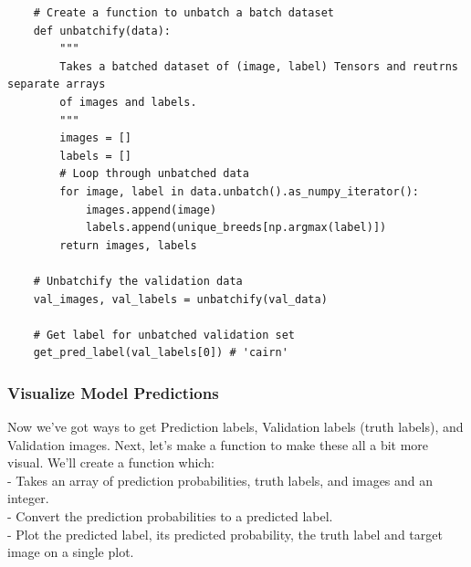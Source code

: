 \documentclass[11pt, a4paper]{article}
\begin{document}
\begin{spacing}{1.1}
\begin{lstlisting}
	# Create a function to unbatch a batch dataset
	def unbatchify(data):
		"""
		Takes a batched dataset of (image, label) Tensors and reutrns separate arrays
		of images and labels.
		"""
		images = []
		labels = []
		# Loop through unbatched data
		for image, label in data.unbatch().as_numpy_iterator():
			images.append(image)
			labels.append(unique_breeds[np.argmax(label)])
		return images, labels
	
	# Unbatchify the validation data
	val_images, val_labels = unbatchify(val_data)
	
	# Get label for unbatched validation set
	get_pred_label(val_labels[0]) # 'cairn'	\end{lstlisting} \vspace*{1mm}
	\subsubsection{Visualize Model Predictions}
	Now we've got ways to get Prediction labels, Validation labels (truth labels), and Validation images. Next, let's make a function to make these all a bit more visual. We'll create a function which: \\
	\hspace*{2mm} - Takes an array of prediction probabilities, truth labels, and images and an integer. \\
	\hspace*{2mm} - Convert the prediction probabilities to a predicted label. \\
	\hspace*{2mm} - Plot the predicted label, its predicted probability, the truth label and target image on a single plot. 
	
	
	
	\end{spacing}
\end{document}
